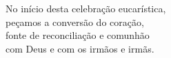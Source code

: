No início desta celebração eucarística, \\ peçamos a conversão do coração, \\ fonte de reconciliação e comunhão \\ com Deus e com os irmãos e irmãs.
\vspace{.2cm}\\
